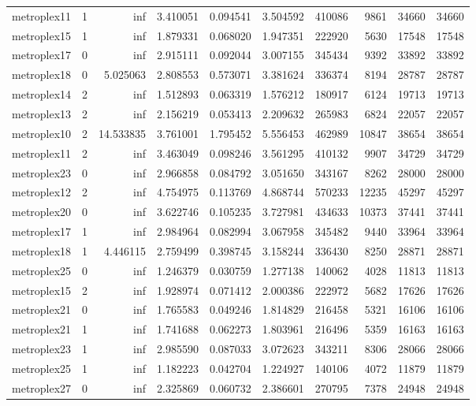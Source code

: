 \begin{longtable}{|l|r|r|r|r|r|r|r|r|r|}
metroplex11 & 1 & inf & 3.410051 & 0.094541 & 3.504592 & 410086 & 9861 & 34660 & 34660 \\
metroplex15 & 1 & inf & 1.879331 & 0.068020 & 1.947351 & 222920 & 5630 & 17548 & 17548 \\
metroplex17 & 0 & inf & 2.915111 & 0.092044 & 3.007155 & 345434 & 9392 & 33892 & 33892 \\
metroplex18 & 0 & 5.025063 & 2.808553 & 0.573071 & 3.381624 & 336374 & 8194 & 28787 & 28787 \\
metroplex14 & 2 & inf & 1.512893 & 0.063319 & 1.576212 & 180917 & 6124 & 19713 & 19713 \\
metroplex13 & 2 & inf & 2.156219 & 0.053413 & 2.209632 & 265983 & 6824 & 22057 & 22057 \\
metroplex10 & 2 & 14.533835 & 3.761001 & 1.795452 & 5.556453 & 462989 & 10847 & 38654 & 38654 \\
metroplex11 & 2 & inf & 3.463049 & 0.098246 & 3.561295 & 410132 & 9907 & 34729 & 34729 \\
metroplex23 & 0 & inf & 2.966858 & 0.084792 & 3.051650 & 343167 & 8262 & 28000 & 28000 \\
metroplex12 & 2 & inf & 4.754975 & 0.113769 & 4.868744 & 570233 & 12235 & 45297 & 45297 \\
metroplex20 & 0 & inf & 3.622746 & 0.105235 & 3.727981 & 434633 & 10373 & 37441 & 37441 \\
metroplex17 & 1 & inf & 2.984964 & 0.082994 & 3.067958 & 345482 & 9440 & 33964 & 33964 \\
metroplex18 & 1 & 4.446115 & 2.759499 & 0.398745 & 3.158244 & 336430 & 8250 & 28871 & 28871 \\
metroplex25 & 0 & inf & 1.246379 & 0.030759 & 1.277138 & 140062 & 4028 & 11813 & 11813 \\
metroplex15 & 2 & inf & 1.928974 & 0.071412 & 2.000386 & 222972 & 5682 & 17626 & 17626 \\
metroplex21 & 0 & inf & 1.765583 & 0.049246 & 1.814829 & 216458 & 5321 & 16106 & 16106 \\
metroplex21 & 1 & inf & 1.741688 & 0.062273 & 1.803961 & 216496 & 5359 & 16163 & 16163 \\
metroplex23 & 1 & inf & 2.985590 & 0.087033 & 3.072623 & 343211 & 8306 & 28066 & 28066 \\
metroplex25 & 1 & inf & 1.182223 & 0.042704 & 1.224927 & 140106 & 4072 & 11879 & 11879 \\
metroplex27 & 0 & inf & 2.325869 & 0.060732 & 2.386601 & 270795 & 7378 & 24948 & 24948 \\

\end{longtable}
